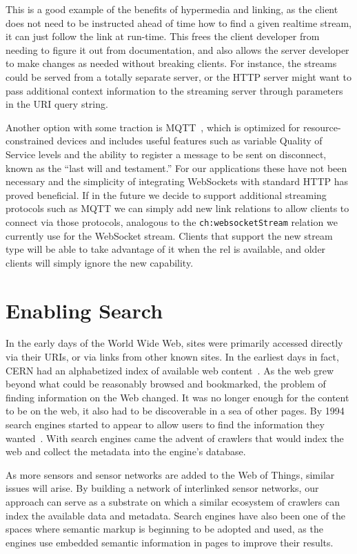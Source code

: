 \documentclass{acm_proc_article-sp}
\begin{document}
This is a good example of the benefits of hypermedia and linking, as the client
does not need to be instructed ahead of time how to find a given realtime
stream, it can just follow the link at run-time. This frees the client
developer from needing to figure it out from documentation, and also allows the
server developer to make changes as needed without breaking clients. For
instance, the streams could be served from a totally separate server, or the
HTTP server might want to pass additional context information to the streaming
server through parameters in the URI query string.

Another option with some traction is MQTT~\cite{collina2012}, which is
optimized for resource-constrained devices and includes useful features such as
variable Quality of Service levels and the ability to register a message to be
sent on disconnect, known as the ``last will and testament.'' For our
applications these have not been necessary and the simplicity of integrating
WebSockets with standard HTTP has proved beneficial. If in the future we decide
to support additional streaming protocols such as MQTT we can simply add new
link relations to allow clients to connect via those protocols, analogous to
the \texttt{ch:websocketStream} relation we currently use for the WebSocket
stream. Clients that support the new stream type will be able to take advantage
of it when the rel is available, and older clients will simply ignore the new
capability.

\section{Enabling Search}
\label{search}

In the early days of the World Wide Web, sites were primarily accessed directly
via their URIs, or via links from other known sites. In the earliest days in
fact, CERN had an alphabetized index of available web
content~\cite{websearchengines}. As the web grew beyond what could be
reasonably browsed and bookmarked, the problem of finding information on the
Web changed. It was no longer enough for the content to be on the web, it also
had to be discoverable in a sea of other pages. By 1994 search engines started
to appear to allow users to find the information they
wanted~\cite{websearchengines}. With search engines came the advent of crawlers
that would index the web and collect the metadata into the engine's database.

As more sensors and sensor networks are added to the Web of Things, similar
issues will arise. By building a network of interlinked sensor networks, our
approach can serve as a substrate on which a similar ecosystem of crawlers can
index the available data and metadata. Search engines have also been one of the
spaces where semantic markup is beginning to be adopted and used, as the
engines use embedded semantic information in pages to improve their results.
\end{document}

